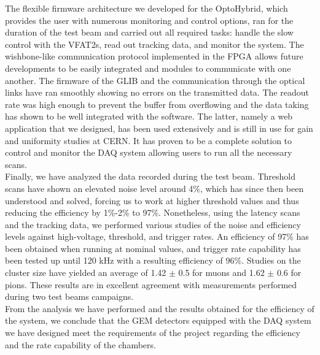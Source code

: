     The flexible firmware architecture we developed for the OptoHybrid, which provides the user with numerous monitoring and control options, ran for the duration of the test beam and carried out all required tasks: handle the slow control with the VFAT2s, read out tracking data, and monitor the system. The wishbone-like communication protocol implemented in the FPGA allows future developments to be easily integrated and modules to communicate with one another. The firmware of the GLIB and the communication through the optical links have ran smoothly showing no errors on the transmitted data. The readout rate was high enough to prevent the buffer from overflowing and the data taking has shown to be well integrated with the software. The latter, namely a web application that we designed, has been used extensively and is still in use for gain and uniformity studies at CERN. It has proven to be a complete solution to control and monitor the DAQ system allowing users to run all the necessary scans. \\

    Finally, we have analyzed the data recorded during the test beam. Threshold scans have shown an elevated noise level around 4\%, which has since then been understood and solved, forcing us to work at higher threshold values and thus reducing the efficiency by 1\%-2\% to 97\%. Nonetheless, using the latency scans and the tracking data, we performed various studies of the noise and efficiency levels against high-voltage, threshold, and trigger rates. An efficiency of 97\% has been obtained when running at nominal values, and trigger rate capability has been tested up until 120 kHz with a resulting efficiency of 96\%. Studies on the cluster size have yielded an average of 1.42 $\pm$ 0.5 for muons and 1.62 $\pm$ 0.6 for pions. These results are in excellent agreement with measurements performed during two test beams campaigns. \\

    From the analysis we have performed and the results obtained for the efficiency of the system, we conclude that the GEM detectors equipped with the DAQ system we have designed meet the requirements of the project regarding the efficiency and the rate capability of the chambers.
